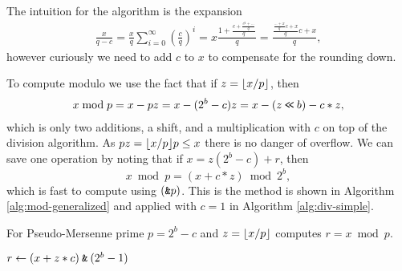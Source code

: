 The intuition for the algorithm is the expansion
\begin{align}
   \frac{x}{q-c}
   = \frac{x}{q}\sum_{i=0}^\infty \left(\frac{c}{q}\right)^i
   = x\frac{1+\frac{c+\frac{c^2 + \dots}{q}}{q}}{q}
   = \frac{\frac{\frac{\dots+x}{q}c+x}{q}c+x}{q},
\end{align}
however curiously we need to add $c$ to $x$ to compensate for the rounding down.









To compute modulo we use the fact that if $z=\lfloor {x/p} \rfloor$, then
\begin{align}
   x \bmod p
   = x - pz
   = x - (2^b-c)z
   = x - (z\mathbin{\texttt{<\!<}} b) - c*z,
\end{align}
which is only two additions, a shift, and a multiplication with $c$ on top of the division algorithm.
As $pz = \lfloor {x/p} \rfloor p \le x$ there is no danger of overflow.
We can save one operation by noting
that if $x = z (2^b-c) + r$, then
$$x\bmod p = \left(x+c*z \right) \bmod 2^b,$$
which is fast to compute using $(\mathbin{\texttt{\&}} p)$.
This is the method is shown in Algorithm \ref{alg:mod-generalized} and applied with $c=1$ in Algorithm \ref{alg:div-simple}.

\begin{algorithm}[H]
   \caption{For Pseudo-Mersenne prime $p=2^b-c$ and $z=\lfloor {x/p} \rfloor$ computes
      $r=x \bmod p$.}
   \label{alg:mod-generalized}
   \begin{algorithmic}
      \State $r \gets (x + z*c) \mathbin{\texttt{\&}} (2^b-1)$
   \end{algorithmic}
\end{algorithm}




